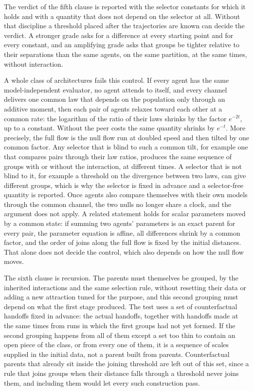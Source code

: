 The verdict of the fifth clause is reported with the selector constants for
which it holds and with a quantity that does not depend on the selector at
all. Without that discipline a threshold placed after the trajectories are
known can decide the verdict. A stronger grade asks for a difference at every
starting point and for every constant, and an amplifying grade asks that
groups be tighter relative to their separations than the same agents, on
the same partition, at the same times, without interaction.

A whole class of architectures fails this control. If every agent has the
same model-independent evaluator, no agent attends to itself, and every
channel delivers one common law that depends on the population only through
an additive moment, then each pair of agents relaxes toward each other at a
common rate: the logarithm of the ratio of their laws shrinks by the factor
$e^{-2t}$, up to a constant. Without the peer costs the same quantity shrinks
by $e^{-t}$. More precisely, the full flow is the null flow run at doubled
speed and then tilted by one common factor. Any selector that is blind to
such a common tilt, for example one that compares pairs through their law
ratios, produces the same sequence of groups with or without the interaction,
at different times. A selector that is not blind to it, for example a
threshold on the divergence between two laws, can give different groups,
which is why the selector is fixed in advance and a selector-free quantity
is reported. Once agents also compare themselves with their own models
through the common channel, the two nulls no longer share a clock, and the
argument does not apply. A related statement holds for scalar parameters
moved by a common state: if summing two agents' parameters is an exact parent
for every pair, the parameter equation is affine, all differences shrink by
a common factor, and the order of joins along the full flow is fixed by the
initial distances. That alone does not decide the control, which also
depends on how the null flow moves.

The sixth clause is recursion. The parents must themselves be grouped, by
the inherited interactions and the same selection rule, without resetting
their data or adding a new attraction tuned for the purpose, and this second
grouping must depend on what the first stage produced. The test uses a set
of counterfactual handoffs fixed in advance: the actual handoffs, together
with handoffs made at the same times from runs in which the first groups had
not yet formed. If the second grouping happens from all of them except a set too thin to contain an open piece of the class, or from every one of
them, it is a sequence of scales supplied in the initial data, not a parent
built from parents. Counterfactual parents that already sit inside the
joining threshold are left out of this set, since a rule that joins groups
when their distance falls through a threshold never joins them, and
including them would let every such construction pass.

